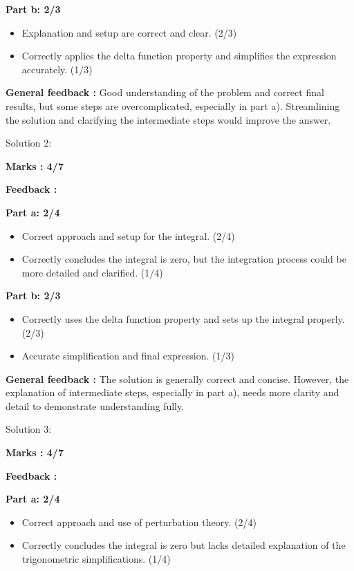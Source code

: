 \documentclass[a4paper,11pt]{article}
\begin{document}
\textbf{Part b: 2/3}
\begin{itemize}
    \item Explanation and setup are correct and clear. (2/3)
    \item Correctly applies the delta function property and simplifies the expression accurately. (1/3)
\end{itemize}

\textbf{General feedback :}
Good understanding of the problem and correct final results, but some steps are overcomplicated, especially in part a). Streamlining the solution and clarifying the intermediate steps would improve the answer.


Solution 2:

\textbf{ Marks : 4/7}

\textbf{Feedback :}

\textbf{Part a: 2/4}

\begin{itemize}
    \item Correct approach and setup for the integral. (2/4)
    \item Correctly concludes the integral is zero, but the integration process could be more detailed and clarified. (1/4)
\end{itemize}

\textbf{Part b: 2/3}
\begin{itemize}
    \item Correctly uses the delta function property and sets up the integral properly. (2/3)
    \item Accurate simplification and final expression. (1/3)
\end{itemize}

\textbf{General feedback :}
The solution is generally correct and concise. However, the explanation of intermediate steps, especially in part a), needs more clarity and detail to demonstrate understanding fully.



Solution 3:


\textbf{ Marks : 4/7}

\textbf{Feedback :}

\textbf{Part a: 2/4}

\begin{itemize}
    \item Correct approach and use of perturbation theory. (2/4)
    \item Correctly concludes the integral is zero but lacks detailed explanation of the trigonometric simplifications. (1/4)
\end{itemize}
\end{document}

